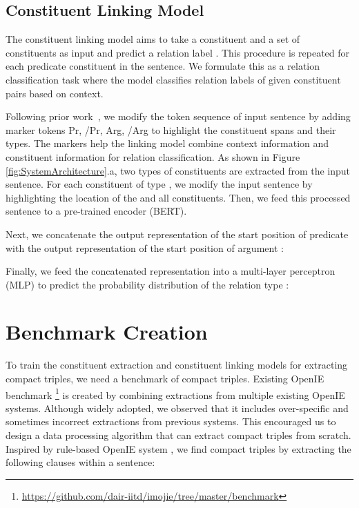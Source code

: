 \documentclass[11pt,a4paper]{article}
\begin{document}
\subsection{Constituent Linking Model}
\label{constituent_linking}

The constituent linking model aims to take a  constituent and a set of  constituents as input and predict a relation label . This procedure is repeated for each predicate constituent in the sentence. We formulate this as a relation classification task where the model classifies relation labels of given constituent pairs based on context. 

Following prior work~\cite{zhang2019ernie,DBLP:journals/corr/abs-2010-12812}, we modify the token sequence of input sentence by adding marker tokens Pr, /Pr, Arg, /Arg to highlight the constituent spans and their types. The markers help the linking model combine context information and constituent information for relation classification. As shown in Figure \ref{fig:SystemArchitecture}.a, two types of constituents are extracted from the input sentence. For each constituent of type , we modify the input sentence by highlighting the location of the  and all  constituents. Then, we feed this processed sentence to a pre-trained encoder (BERT).

{Next, we concatenate the output representation of the start position of predicate  with the output representation of the start position of argument : }

\vspace{-0.75em}



\noindent
Finally, we feed the concatenated representation into a multi-layer perceptron (MLP) to predict the probability distribution of the relation type : 

\vspace{-1em}



\vspace{-0.5em}

\section{Benchmark Creation}
\label{benchmark}

To train the constituent extraction and constituent linking models for extracting compact triples, we need a benchmark of compact triples.
Existing OpenIE benchmark
\footnote{\url{https://github.com/dair-iitd/imojie/tree/master/benchmark}} 
is created by combining extractions from multiple existing OpenIE systems. 
Although widely adopted, we observed that it includes over-specific and sometimes incorrect extractions from previous systems. This encouraged us to design a data processing algorithm that can extract compact triples from scratch. {Inspired by rule-based OpenIE system \cite{clausie}, we find compact triples by extracting the following clauses within a sentence:}
\end{document}
